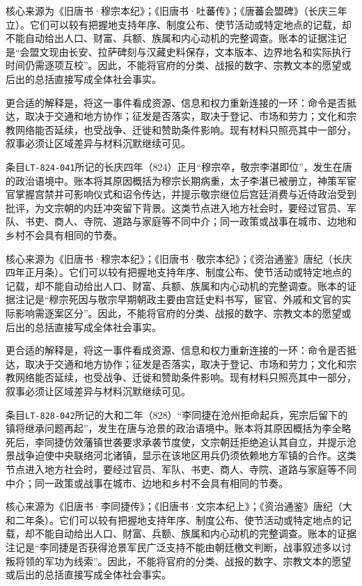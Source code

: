 核心来源为《旧唐书·穆宗本纪》；《旧唐书·吐蕃传》；《唐蕃会盟碑》（长庆三年立）。它们可以较有把握地支持年序、制度公布、使节活动或特定地点的记载，却不能自动给出人口、财富、兵额、族属和内心动机的完整调查。账本的证据注记是“会盟文现由长安、拉萨碑刻与汉藏史料保存，文本版本、边界地名和实际执行时间仍需逐项互校”。因此，不能将官府的分类、战报的数字、宗教文本的愿望或后出的总括直接写成全体社会事实。

更合适的解释是，将这一事件看成资源、信息和权力重新连接的一环：命令是否抵达，取决于交通和地方协作；征发是否落实，取决于登记、市场和劳力；文化和宗教网络能否延续，也受战争、迁徙和赞助条件影响。现有材料只照亮其中一部分，叙事必须让区域差异与材料沉默继续可见。

条目\texttt{LT-824-041}所记的长庆四年（824）正月“穆宗卒，敬宗李湛即位”，发生在唐的政治语境中。账本将其原因概括为穆宗长期病重，太子李湛已被册立，神策军宦官掌握宫禁并可影响仪式和诏令传达，并提示敬宗继位后宫廷消费与近侍政治受到批评，为文宗朝的内廷冲突留下背景。这类节点进入地方社会时，要经过官员、军队、书吏、商人、寺院、道路与家庭等不同中介；同一政策或战事在城市、边地和乡村不会具有相同的节奏。

核心来源为《旧唐书·穆宗本纪》；《旧唐书·敬宗本纪》；《资治通鉴》唐纪（长庆四年正月条）。它们可以较有把握地支持年序、制度公布、使节活动或特定地点的记载，却不能自动给出人口、财富、兵额、族属和内心动机的完整调查。账本的证据注记是“穆宗死因与敬宗早期朝政主要由宫廷史料书写，宦官、外戚和文官的实际影响需逐案区分”。因此，不能将官府的分类、战报的数字、宗教文本的愿望或后出的总括直接写成全体社会事实。

更合适的解释是，将这一事件看成资源、信息和权力重新连接的一环：命令是否抵达，取决于交通和地方协作；征发是否落实，取决于登记、市场和劳力；文化和宗教网络能否延续，也受战争、迁徙和赞助条件影响。现有材料只照亮其中一部分，叙事必须让区域差异与材料沉默继续可见。

条目\texttt{LT-828-042}所记的大和二年（828）“李同捷在沧州拒命起兵，宪宗后留下的镇将继承问题再起”，发生在唐与沧景的政治语境中。账本将其原因概括为李全略死后，李同捷仿效藩镇世袭要求承袭节度使，文宗朝廷拒绝追认其自立，并提示沧景战争迫使中央联络河北诸镇，显示在该地区用兵仍须依赖地方军镇的合作。这类节点进入地方社会时，要经过官员、军队、书吏、商人、寺院、道路与家庭等不同中介；同一政策或战事在城市、边地和乡村不会具有相同的节奏。

核心来源为《旧唐书·李同捷传》；《旧唐书·文宗本纪上》；《资治通鉴》唐纪（大和二年条）。它们可以较有把握地支持年序、制度公布、使节活动或特定地点的记载，却不能自动给出人口、财富、兵额、族属和内心动机的完整调查。账本的证据注记是“李同捷是否获得沧景军民广泛支持不能由朝廷檄文判断，战事叙述多以讨叛将领的军功为线索”。因此，不能将官府的分类、战报的数字、宗教文本的愿望或后出的总括直接写成全体社会事实。

